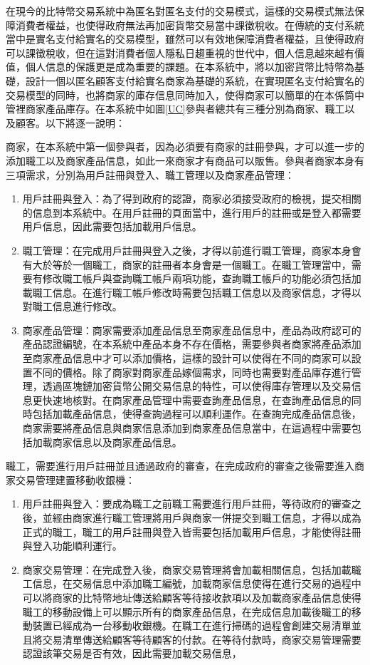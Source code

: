 在現今的比特幣交易系統中為匿名對匿名支付的交易模式，這樣的交易模式無法保障消費者權益，也使得政府無法再加密貨幣交易當中課徵稅收。在傳統的支付系統當中是實名支付給實名的交易模型，雖然可以有效地保障消費者權益，且使得政府可以課徵稅收，但在這對消費者個人隱私日趨重視的世代中，個人信息越來越有價值，個人信息的保護更是成為重要的課題。在本系統中，將以加密貨幣比特幣為基礎，設計一個以匿名顧客支付給實名商家為基礎的系統，在實現匿名支付給實名的交易模型的同時，也將商家的庫存信息同時加入，使得商家可以簡單的在本係筒中管裡商家產品庫存。在本系統中如圖\ref{UC}參與者總共有三種分別為商家、職工以及顧客。以下將逐一說明：

商家，在本系統中第一個參與者，因為必須要有商家的註冊參與，才可以進一步的添加職工以及商家產品信息，如此一來商家才有商品可以販售。參與者商家本身有三項需求，分別為用戶註冊與登入、職工管理以及商家產品管理：

	\begin{enumerate}
	\item 用戶註冊與登入：為了得到政府的認證，商家必須接受政府的檢視，提交相關的信息到本系統中。在用戶註冊的頁面當中，進行用戶的註冊或是登入都需要用戶信息，因此需要包括加載用戶信息。
	\item 職工管理：在完成用戶註冊與登入之後，才得以前進行職工管理，商家本身會有大於等於一個職工，商家的註冊者本身會是一個職工。在職工管理當中，需要有修改職工帳戶與查詢職工帳戶兩項功能，查詢職工帳戶的功能必須包括加載職工信息。在進行職工帳戶修改時需要包括職工信息以及商家信息，才得以對職工信息進行修改。
	\item 商家產品管理：商家需要添加產品信息至商家產品信息中，產品為政府認可的產品認證編號，在本系統中產品本身不存在價格，需要參與者商家將產品添加至商家產品信息中才可以添加價格，這樣的設計可以使得在不同的商家可以設置不同的價格。除了商家對商家產品嫁個需求，同時也需要對產品庫存進行管理，透過區塊鏈加密貨幣公開交易信息的特性，可以使得庫存管理以及交易信息更快速地核對。在商家產品管理中需要查詢產品信息，在查詢產品信息的同時包括加載產品信息，使得查詢過程可以順利運作。在查詢完成產品信息後，商家需要將產品信息與商家信息添加到商家產品信息當中，在這過程中需要包括加載商家信息以及商家產品信息。

	\end{enumerate}

職工，需要進行用戶註冊並且通過政府的審查，在完成政府的審查之後需要進入商家交易管理建置移動收銀機：

	\begin{enumerate}
	\item 用戶註冊與登入：要成為職工之前職工需要進行用戶註冊，等待政府的審查之後，並經由商家進行職工管理將用戶與商家一併提交到職工信息，才得以成為正式的職工，職工的用戶註冊與登入皆需要包括加載用戶信息，才能使得註冊與登入功能順利運行。
	\item 商家交易管理：在完成登入後，商家交易管理將會加載相關信息，包括加載職工信息，在交易信息中添加職工編號，加載商家信息使得在進行交易的過程中可以將商家的比特幣地址傳送給顧客等待接收款項以及加載商家產品信息使得職工的移動設備上可以顯示所有的商家產品信息，在完成信息加載後職工的移動裝置已經成為一台移動收銀機。在職工在進行掃碼的過程會創建交易清單並且將交易清單傳送給顧客等待顧客的付款。在等待付款時，商家交易管理需要認證該筆交易是否有效，因此需要加載交易信息，
	\end{enumerate}

